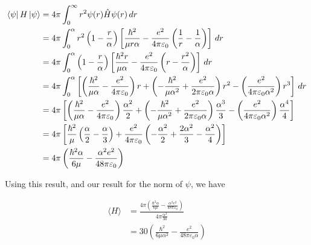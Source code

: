     \begin{equation*}
    \begin{split}
        \bra{\psi}H\ket{\psi} & = 4\pi \int_{0}^{\infty} r^{2} \psi(r)\hat{H}\psi(r)\,dr \\
        & = 4\pi \int_{0}^{\alpha} r^{2}\left(1 - \frac{r}{\alpha}\right)\left[\frac{\hbar^2}{\mu  r\alpha} - \frac{e^2}{4\pi\varepsilon_0}\left(\frac{1}{r} - \frac{1}{\alpha}\right)\right]\,dr \\
        & = 4\pi \int_{0}^{\alpha} \left(1 - \frac{r}{\alpha}\right)\left[\frac{\hbar^{2}r}{\mu    \alpha} - \frac{e^2}{4\pi\varepsilon_0}\left(r - \frac{r^{2}}{\alpha}\right)\right]\,dr \\
        & = 4\pi \int_{0}^{\alpha} \left[\left(\frac{\hbar^{2}}{\mu    \alpha} - \frac{e^{2}}{4\pi\varepsilon_0}\right)r + \left( -\frac{\hbar^{2}}{\mu   \alpha^{2}} + \frac{e^{2}}{2\pi\varepsilon_{0}\alpha} \right)r^{2} - \left( \frac{e^{2}}{4\pi\varepsilon_{0}\alpha^{2}}\right)r^{3}\right]\,dr \\
        & = 4\pi \left[\left(\frac{\hbar^{2}}{\mu  \alpha} - \frac{e^{2}}{4\pi\varepsilon_0}\right)\frac{\alpha^{2}}{2} + \left( -\frac{\hbar^{2}}{\mu  \alpha^{2}} + \frac{e^{2}}{2\pi\varepsilon_{0}\alpha} \right)\frac{\alpha^3}{3} - \left( \frac{e^{2}}{4\pi\varepsilon_{0}\alpha^{2}}\right)\frac{\alpha^4}{4}\right] \\
        & = 4\pi \left[ \frac{\hbar^{2}}{\mu   }\left( \frac{\alpha}{2} - \frac{\alpha}{3}\right) + \frac{e^{2}}{4\pi\varepsilon_0}\left( -\frac{\alpha^2}{2} + \frac{2\alpha^2}{3} - \frac{\alpha^2}{4}\right) \right] \\
        & = 4\pi \left( \frac{\hbar^{2}\alpha}{6\mu} - \frac{\alpha^{2}e^2}{48\pi\varepsilon_{0}} \right)
    \end{split}
    \end{equation*}

    Using this result, and our result for the norm of $\psi$, we have

    \begin{equation*}
    \begin{split}
        \langle H \rangle & = \frac{4\pi \left( \frac{\hbar^{2}\alpha}{6\mu} - \frac{\alpha^{2}e^2}{48\pi\varepsilon_{0}} \right)}{4\pi \frac{\alpha^3}{30}} \\
        & = 30 \left( \frac{\hbar^{2}}{6\mu\alpha^2} - \frac{e^2}{48\pi\varepsilon_{0}\alpha} \right)
    \end{split}
    \end{equation*}


